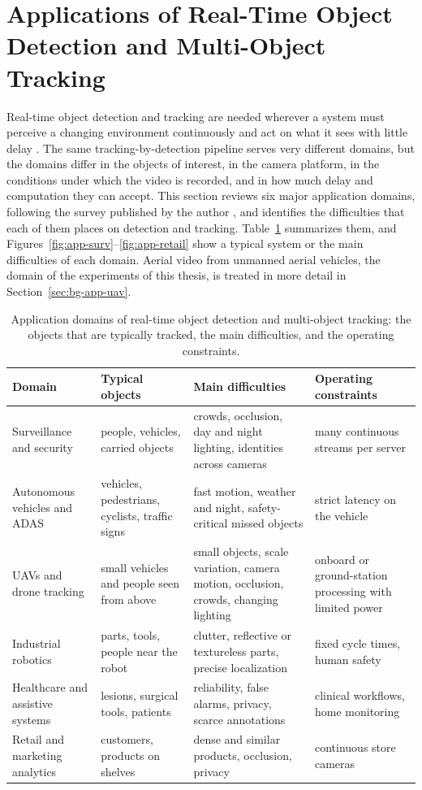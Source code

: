 \section{Applications of Real-Time Object Detection and Multi-Object Tracking}\label{sec:bg-apps}
Real-time object detection and tracking are needed wherever a system must perceive a changing environment continuously and act on what it sees with little delay \cite{li2025motreview,ismail2026realtime}. The same tracking-by-detection pipeline serves very different domains, but the domains differ in the objects of interest, in the camera platform, in the conditions under which the video is recorded, and in how much delay and computation they can accept. This section reviews six major application domains, following the survey published by the author \cite{ismail2026realtime}, and identifies the difficulties that each of them places on detection and tracking. Table~\ref{tab:bg-apps} summarizes them, and Figures~\ref{fig:app-surv}--\ref{fig:app-retail} show a typical system or the main difficulties of each domain. Aerial video from unmanned aerial vehicles, the domain of the experiments of this thesis, is treated in more detail in Section~\ref{sec:bg-app-uav}.

\begin{table}[tbp]
\centering
\caption{Application domains of real-time object detection and multi-object tracking: the objects that are typically tracked, the main difficulties, and the operating constraints.}
\label{tab:bg-apps}
\footnotesize\setlength{\tabcolsep}{4pt}\renewcommand{\arraystretch}{1.25}
\begin{tabular}{>{\raggedright\arraybackslash}p{2.9cm}>{\raggedright\arraybackslash}p{3.2cm}>{\raggedright\arraybackslash}p{4.5cm}>{\raggedright\arraybackslash}p{3.5cm}}
\toprule
Domain & Typical objects & Main difficulties & Operating constraints\\
\midrule
Surveillance and security & people, vehicles, carried objects & crowds, occlusion, day and night lighting, identities across cameras & many continuous streams per server\\
Autonomous vehicles and ADAS & vehicles, pedestrians, cyclists, traffic signs & fast motion, weather and night, safety-critical missed objects & strict latency on the vehicle\\
UAVs and drone tracking & small vehicles and people seen from above & small objects, scale variation, camera motion, occlusion, crowds, changing lighting & onboard or ground-station processing with limited power\\
Industrial robotics & parts, tools, people near the robot & clutter, reflective or textureless parts, precise localization & fixed cycle times, human safety\\
Healthcare and assistive systems & lesions, surgical tools, patients & reliability, false alarms, privacy, scarce annotations & clinical workflows, home monitoring\\
Retail and marketing analytics & customers, products on shelves & dense and similar products, occlusion, privacy & continuous store cameras\\
\bottomrule
\end{tabular}
\end{table}

